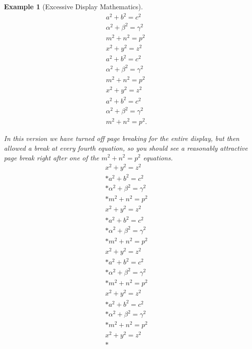 \documentclass[pdflatex]{sn-jnl}
\theoremstyle{thmstyleone}%
\theoremstyle{thmstyletwo}%
\newtheorem{example}[theorem]{Example}
\theoremstyle{thmstylethree}%
\numberwithin{equation}{section}
\begin{document}
\begin{example}[Excessive Display Mathematics]
\begin{gather*}
a^2+b^2=c^2\\
\alpha^2+\beta^2=\gamma^2\\
m^2+n^2=p^2\\
x^2+y^2=z^2\\
a^2+b^2=c^2\\
\alpha^2+\beta^2=\gamma^2\\
m^2+n^2=p^2\\
x^2+y^2=z^2\\
a^2+b^2=c^2\\
\alpha^2+\beta^2=\gamma^2\\
m^2+n^2=p^2\text{.}
\end{gather*}
%
\par
In this version we have turned off page breaking for the entire display, but then allowed a break at every fourth equation, so you should see a reasonably attractive page break right after one of the \(m^2+n^2=p^2\) equations.%
\begin{gather}
x^2+y^2=z^2\label{section-mathematics-4-10-3-2-1}\\*
a^2+b^2=c^2\label{section-mathematics-4-10-3-2-2}\\*
\alpha^2+\beta^2=\gamma^2\label{section-mathematics-4-10-3-2-3}\\*
m^2+n^2=p^2\label{section-mathematics-4-10-3-2-4}\\
x^2+y^2=z^2\label{section-mathematics-4-10-3-2-5}\\*
a^2+b^2=c^2\label{section-mathematics-4-10-3-2-6}\\*
\alpha^2+\beta^2=\gamma^2\label{section-mathematics-4-10-3-2-7}\\*
m^2+n^2=p^2\label{section-mathematics-4-10-3-2-8}\\
x^2+y^2=z^2\label{section-mathematics-4-10-3-2-9}\\*
a^2+b^2=c^2\label{section-mathematics-4-10-3-2-10}\\*
\alpha^2+\beta^2=\gamma^2\label{section-mathematics-4-10-3-2-11}\\*
m^2+n^2=p^2\label{section-mathematics-4-10-3-2-12}\\
x^2+y^2=z^2\label{section-mathematics-4-10-3-2-13}\\*
a^2+b^2=c^2\label{section-mathematics-4-10-3-2-14}\\*
\alpha^2+\beta^2=\gamma^2\label{section-mathematics-4-10-3-2-15}\\*
m^2+n^2=p^2\label{section-mathematics-4-10-3-2-16}\\
x^2+y^2=z^2\label{section-mathematics-4-10-3-2-17}\\*

\end{gather}
\end{example}
\end{document}
